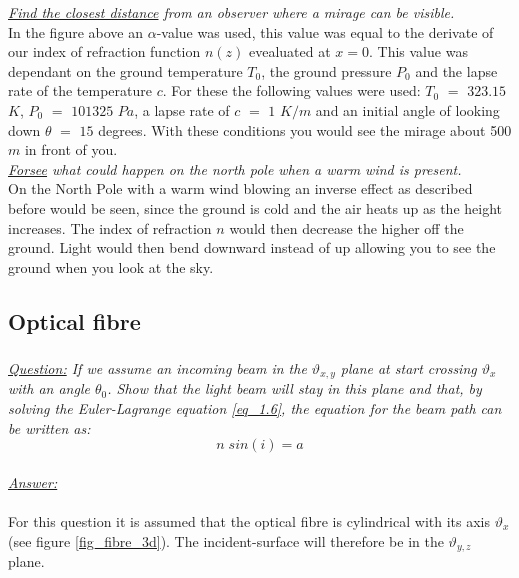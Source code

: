 \documentclass{article}
\begin{document}
\textit{\underline{Find the closest distance} from an observer where a mirage can be visible.}\\
In the figure above an $\alpha$-value was used, this value was equal to the derivate of our index of refraction function $n(z)$ evealuated at $x=0$. This value was dependant on the ground temperature $T_0$, the ground pressure $P_0$ and the lapse rate of the temperature $c$. For these the following values were used: $T_0$ $=$ $323.15$ $K$, $P_0$ $=$ $101325$ $Pa$, a lapse rate of $c$ $=$ $1$ $K/m$ and an initial angle of looking down $\theta$ $=$ $15$ degrees. With these conditions you would see the mirage about 500 $m$ in front of you.\\

\textit{\underline{Forsee} what could happen on the north pole when a warm wind is present.}\\
On the North Pole with a warm wind blowing an inverse effect as described before would be seen, since the ground is cold and the air heats up as the height increases. The index of refraction $n$ would then decrease the higher off the ground. Light would then bend downward instead of up allowing you to see the ground when you look at the sky.

\subsection{Optical fibre}

\subsubsection{}

\textit{\underline{Question:} If we assume an incoming beam in the $\vartheta _{x,y}$ plane at start crossing $\vartheta _x$ with an angle $\theta _0$. Show that the light beam will stay in this plane and that, by solving the Euler-Lagrange equation \ref{eq_1.6}, the equation for the beam path can be written as:}\\
\begin{equation}
	n \; sin(i) = a
	\label{eq_2.1}
\end{equation}
\\
\textit{\underline{Answer:}} \\
\\

For this question it is assumed that the optical fibre is cylindrical with its axis $\vartheta _x$ (see figure \ref{fig_fibre_3d}). The incident-surface will therefore be in the $\vartheta _{y,z}$ plane.\\
\end{document}

